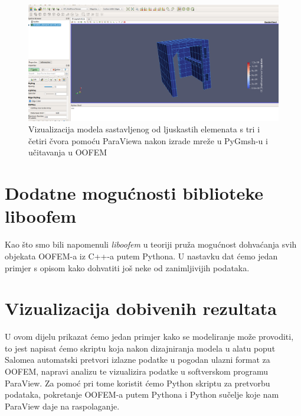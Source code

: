 \documentclass[a4paper,twoside,12pt]{memoir} %
\begin{document}
\begin{figure}[h!t]
\begin{center}
\includegraphics[scale=0.3]{pictures/chapter_zadatak/brodski_element.png}
\caption{Vizualizacija modela sastavljenog od ljuskastih elemenata s tri i četiri čvora pomoću ParaViewa nakon izrade mreže u PyGmsh-u i učitavanja u OOFEM }
\label{fig:brodski_element}
\end{center}
\end{figure}

\section{Dodatne mogućnosti biblioteke liboofem}
Kao što smo bili napomenuli \textit{liboofem} u teoriji pruža mogućnost dohvaćanja svih objekata OOFEM-a iz C++-a putem Pythona. U nastavku dat ćemo jedan primjer s opisom kako dohvatiti još neke od zanimljivijih podataka.




\section{Vizualizacija dobivenih rezultata}
U ovom dijelu prikazat ćemo jedan primjer kako se modeliranje može provoditi, to jest napisat ćemo skriptu koja nakon dizajniranja modela u alatu poput Salomea automatski pretvori izlazne podatke u pogodan ulazni format za OOFEM, napravi analizu te vizualizira podatke u softverskom programu ParaView. Za pomoć pri tome koristit ćemo Python skriptu za pretvorbu podataka, pokretanje OOFEM-a putem Pythona i Python sučelje koje nam ParaView daje na raspolaganje.
\end{document}
